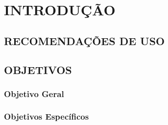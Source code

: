 \section{INTRODUÇÃO}
    
    \subsection{RECOMENDAÇÕES DE USO}

    \subsection{OBJETIVOS}

    \subsubsection{Objetivo Geral}
    
    \subsubsection{Objetivos Específicos}